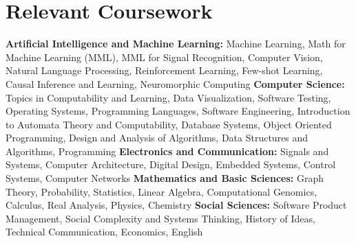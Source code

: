 \documentclass[letterpaper,11pt]{article}
\newcommand{\resumeSubHeadingListStart}{\begin{itemize}[leftmargin=0.0in, label={}]}
\newcommand{\resumeSubHeadingListEnd}{\end{itemize}}
\begin{document}
\section{Relevant Coursework}
    \begin{itemize}[leftmargin=0.15in, label={}]
    \small{\item{{\textbf{Artificial Intelligence and Machine Learning:}} Machine Learning,  Math for Machine Learning (MML), MML for Signal Recognition, Computer Vision, Natural Language Processing, Reinforcement Learning, Few-shot Learning, Causal Inference and Learning, Neuromorphic Computing
    \newline
    {\textbf{Computer Science:}} Topics in Computability and Learning, Data Visualization, Software Testing, Operating Systems, Programming Languages, Software Engineering, Introduction to Automata Theory and Computability, Database Systems, Object Oriented Programming, Design and Analysis of Algorithms, Data Structures and Algorithms, Programming}
    {\textbf{Electronics and Communication:}} Signals and Systems, Computer Architecture, Digital Design, Embedded Systems, Control Systems, Computer Networks
    \newline
    {\textbf{Mathematics and Basic Sciences:}} Graph Theory, Probability, Statistics, Linear Algebra, Computational Genomics, Calculus, Real Analysis, Physics, Chemistry
    \newline
    {\textbf{Social Sciences:}} Software Product Management, Social Complexity and Systems Thinking, History of Ideas, Technical Communication, Economics, English
    \newline}
    \end{itemize}
        \vspace{-18pt}

 \vspace{-12pt}
\end{document}
